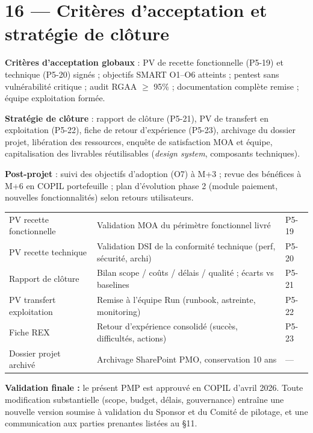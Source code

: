 \documentclass[11pt,a4paper,oneside]{report}
\begin{document}
\section*{16 — Critères d'acceptation et stratégie de clôture}

\textbf{Critères d'acceptation globaux} : PV de recette fonctionnelle (P5-19) et technique
(P5-20) signés ; objectifs SMART O1–O6 atteints ; pentest sans vulnérabilité critique ;
audit RGAA $\geq$ 95\% ; documentation complète remise ; équipe exploitation formée.

\textbf{Stratégie de clôture} : rapport de clôture (P5-21), PV de transfert en exploitation
(P5-22), fiche de retour d'expérience (P5-23), archivage du dossier projet,
libération des ressources, enquête de satisfaction MOA et équipe, capitalisation des
livrables réutilisables (\textit{design system}, composants techniques).

\textbf{Post-projet} : suivi des objectifs d'adoption (O7) à M+3 ; revue des bénéfices à
M+6 en COPIL portefeuille ; plan d'évolution phase 2 (module paiement, nouvelles
fonctionnalités) selon retours utilisateurs.

\vspace{4pt}
\renewcommand{\arraystretch}{1.3}
\begin{tabularx}{\textwidth}{L{3.5cm} Y C{2.5cm}}
\toprule
{} &  &  \\
\midrule
PV recette fonctionnelle & Validation MOA du périmètre fonctionnel livré & P5-19 \\
PV recette technique     & Validation DSI de la conformité technique (perf, sécurité, archi) & P5-20 \\
Rapport de clôture       & Bilan scope / coûts / délais / qualité ; écarts vs baselines & P5-21 \\
PV transfert exploitation & Remise à l'équipe Run (runbook, astreinte, monitoring) & P5-22 \\
Fiche REX                & Retour d'expérience consolidé (succès, difficultés, actions) & P5-23 \\
Dossier projet archivé   & Archivage SharePoint PMO, conservation 10 ans & — \\
\bottomrule
\end{tabularx}

\vspace{2pt}
\textbf{Validation finale :} le présent PMP est approuvé en COPIL d'avril 2026. Toute
modification substantielle (scope, budget, délais, gouvernance) entraîne une nouvelle
version soumise à validation du Sponsor et du Comité de pilotage, et une communication aux
parties prenantes listées au §11.
\end{document}

